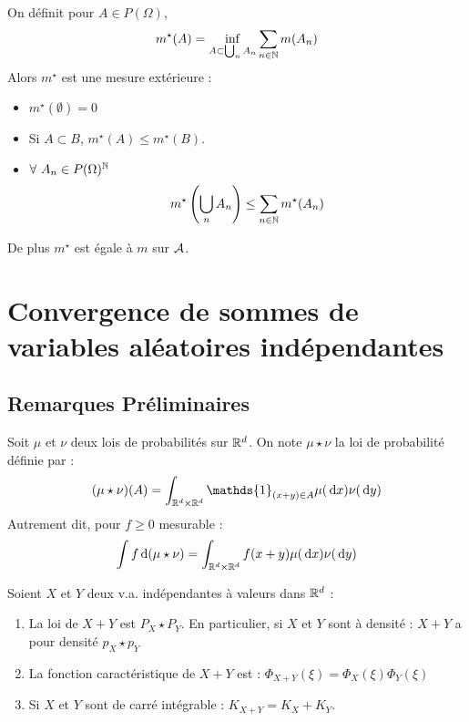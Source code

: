 \documentclass{cours}
\begin{document}
            \begin{lemma}
                On définit pour $A \in P(\Omega)$, \[m^{\star}(A) = \inf_{A \subset \bigcup_{n} A_{n}} \sum_{n \in \mathbb{N}} m(A_{n})\]
                Alors $m^{\star}$ est une mesure extérieure :
                \begin{itemize}
                    \item $m^{\star}(\emptyset) = 0$
                    \item Si $A \subset B$, $m^{\star}(A) \leq m^{\star}(B)$.
                    \item $\forall \ A_{n} \in P(\Omega)^{\mathbb{N}}$ \[
                        m^{\star}\left(\bigcup_{n} A_{n}\right) \leq \sum_{n \in \mathbb{N}} m^{\star}(A_{n})
                    \]
                \end{itemize}
                De plus $m^{\star}$ est égale à $m$ sur $\mathcal{A}$.
            \end{lemma}
        
        \section{Convergence de sommes de variables aléatoires indépendantes}
        \subsection{Remarques Préliminaires}
        \begin{definition}
            Soit $\mu$ et $\nu$ deux lois de probabilités sur $\mathbb{R}^{d}$. On note $\mu \star \nu$ la loi de probabilité définie par :
            \[
                (\mu \star \nu)(A) = \int_{\R^{d} \times \R^{d}} \mathds{1}_{(x + y) \in A} \mu(\d x) \nu(\d y)
            \]
            Autrement dit, pour $f \geq 0$ mesurable : 
            \[
                \int f {\rm \, d}(\mu \star \nu) = \int_{\mathbb{R}^{d} \times \mathbb{R}^{d}} f(x + y)\mu({\rm \, d} x) \nu({\rm \, d} y)
            \]
        \end{definition}

        \begin{proposition}
            Soient $X$ et $Y$ deux v.a. indépendantes à valeurs dans $\mathbb{R}^{d}$ :
            \begin{enumerate}
                \item La loi de $X + Y$ est $P_{X} \star P_{Y}$. En particulier, si $X$ et $Y$ sont à densité : $X + Y$ a pour densité $p_{X} \star p_{Y}$
                \item La fonction caractéristique de $X + Y$ est : $\Phi_{X + Y}(\xi) = \Phi_{X}(\xi)\Phi_{Y}(\xi)$
                \item Si $X$ et $Y$ sont de carré intégrable : $K_{X + Y} = K_{X} + K_{Y}$.
            \end{enumerate}
        \end{proposition}
\end{document}
